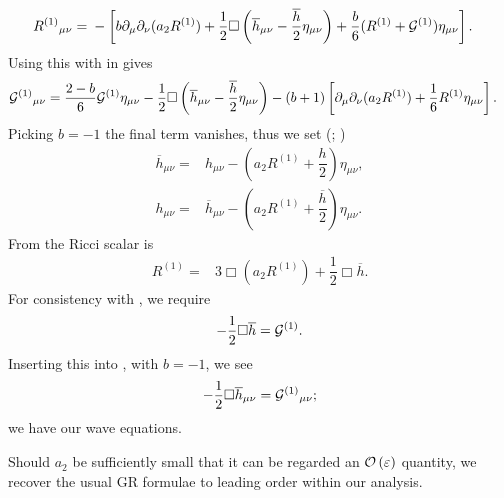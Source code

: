 \begin{align}
{R^{(1)}}_{\mu\nu} = {} & -\left[b \partial_\mu\partial_\nu(a_2  R^{(1)}) + \dfrac{1}{2}\Box\left(\overline{h}_{\mu\nu} -\dfrac{\overline{h}}{2}\eta_{\mu\nu}\right) + \dfrac{b}{6}(R^{(1)} + \mathcal{G}^{(1)})\eta_{\mu\nu}\right].
\label{eq:new_Ricci}
\end{align}
Using this with  in  gives
\begin{align}
{\mathcal{G}^{(1)}}_{\mu\nu} = {} & \dfrac{2 - b}{6}\mathcal{G}^{(1)}\eta_{\mu\nu} -\dfrac{1}{2}\Box\left(\overline{h}_{\mu\nu} - \dfrac{\overline{h}}{2}\eta_{\mu\nu}\right) - (b + 1)\left[\partial_\mu\partial_\nu(a_2 R^{(1)}) + \dfrac{1}{6}R^{(1)}\eta_{\mu\nu}\right].
\label{eq:b_Field}
\end{align}
Picking $b = -1$ the final term vanishes, thus we set (\citealt[section 10.3]{Will1993}; \citealt{Corda2008, Capozziello2008}) %
\begin{subequations}
\begin{align}
\label{eq:hbar_metric}
\overline{h}_{\mu\nu} = {} & h_{\mu\nu} - \left(a_2 R^{(1)} + \dfrac{h}{2}\right)\eta_{\mu\nu},\\
h_{\mu\nu} = {} & \overline{h}_{\mu\nu} - \left(a_2 R^{(1)} + \dfrac{\overline{h}}{2}\right)\eta_{\mu\nu}.
\label{eq:h_metric}
\end{align}
\end{subequations}
From  the Ricci scalar is 
\begin{align}
R^{(1)} = {} & 3 \Box(a_2 R^{(1)}) + \dfrac{1}{2}\Box \overline{h}.
\label{eq:Ricci_Box_h}
\end{align}
For consistency with , we require
\begin{equation}
-\dfrac{1}{2}\Box \overline{h} = \mathcal{G}^{(1)}.
\label{eq:Box_h}
\end{equation}
Inserting this into , with $b = -1$, we see
\begin{equation}
-\dfrac{1}{2}\Box \overline{h}_{\mu\nu} = {\mathcal{G}^{(1)}}_{\mu\nu};
\label{eq:Box_hmunu}
\end{equation}
we have our wave equations.

Should $a_2$ be sufficiently small that it can be regarded an $\mathcal{O}\left({\varepsilon}\right)$ quantity, we recover the usual GR formulae to leading order within our analysis.

